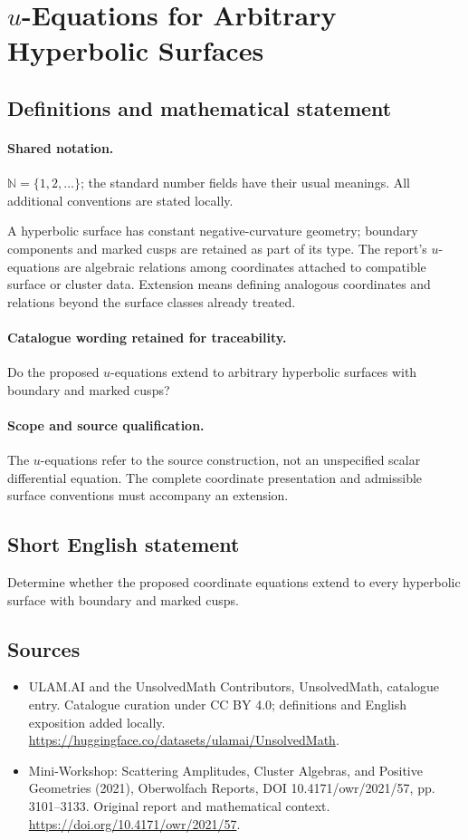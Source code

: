 \documentclass[11pt]{article}
\begin{document}
\section{$u$-Equations for Arbitrary Hyperbolic Surfaces}\label{statement}

\subsection{Definitions and mathematical statement}

\paragraph{Shared notation.}$\mathbb N=\{1,2,\ldots\}$; the standard number fields have their usual meanings. All additional conventions are stated locally.


A hyperbolic surface has constant negative-curvature geometry; boundary components and marked cusps are retained as part of its type. The report's $u$-equations are algebraic relations among coordinates attached to compatible surface or cluster data. Extension means defining analogous coordinates and relations beyond the surface classes already treated.

\paragraph{Catalogue wording retained for traceability.}
Do the proposed $u$-equations extend to arbitrary hyperbolic surfaces with boundary and marked cusps?

\paragraph{Scope and source qualification.}The $u$-equations refer to the source construction, not an unspecified scalar differential equation. The complete coordinate presentation and admissible surface conventions must accompany an extension.
\subsection{Short English statement}
Determine whether the proposed coordinate equations extend to every hyperbolic surface with boundary and marked cusps.
\subsection{Sources}
\begin{itemize}
\item[\hypertarget{source:statement:1}{S1}] ULAM.AI and the UnsolvedMath Contributors, UnsolvedMath, catalogue entry. Catalogue curation under CC BY 4.0; definitions and English exposition added locally.
\url{https://huggingface.co/datasets/ulamai/UnsolvedMath}.
\item[\hypertarget{source:statement:2}{S2}] Mini-Workshop: Scattering Amplitudes, Cluster Algebras, and Positive Geometries (2021), Oberwolfach Reports, DOI 10.4171/owr/2021/57, pp. 3101--3133. Original report and mathematical context.
\url{https://doi.org/10.4171/owr/2021/57}.
\end{itemize}
\label{end:statement}
\end{document}
